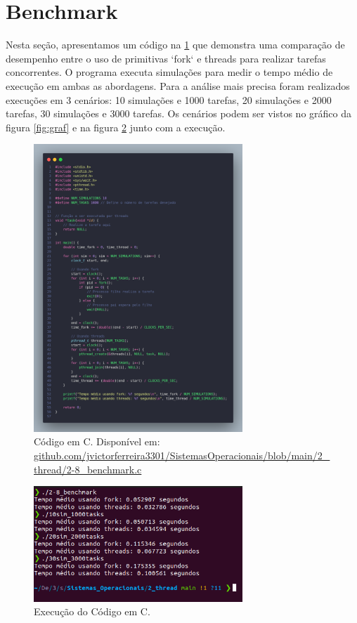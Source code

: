\documentclass[
	12pt,				%
	openright,			%
	oneside,			%
	a4paper,			%
	chapter=TITLE,		%
	english,			%
	french,				%
	spanish,			%
	brazil				%
	]{abntex2}
\theoremstyle{definition}
\begin{document}
\section{Benchmark}

Nesta seção, apresentamos um código na \ref{fig:processos8} que demonstra uma comparação 
de desempenho entre o uso de primitivas `fork` e threads para realizar tarefas 
concorrentes. O programa executa simulações para medir o tempo médio de 
execução em ambas as abordagens. Para a análise mais precisa foram realizados
execuções em 3 cenários: 10 simulações e 1000 tarefas, 20 simulações e 2000 tarefas,
30 simulações e 3000 tarefas. Os cenários podem ser vistos no gráfico da figura \ref{fig:graf}
e na figura \ref{fig:run8} junto com a execução.

\begin{figure}
    \centering
    \includegraphics[width=0.7\textwidth]{imagens/processos_8.png}
    \caption{Código em C. Disponível em: \href{https://github.com/jvictorferreira3301/Sistemas_Operacionais/blob/main/2_thread/2-8_benchmark.c}{github.com/jvictorferreira3301/SistemasOperacionais/blob/main/2\_thread/2-8\_benchmark.c}}
    \label{fig:processos8}
\end{figure}

\begin{figure}
    \centering
    \includegraphics[width=0.7\textwidth]{imagens/run_processos_8.png}
    \caption{Execução do Código em C.}
    \label{fig:run8}
\end{figure}
\end{document}

